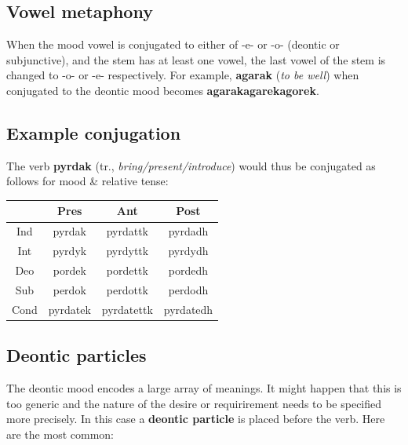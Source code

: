 \documentclass[10pt,oneside]{memoir}
\begin{document}
\begin{multicols}{2}
	\subsection{Vowel metaphony}

	When the mood vowel is conjugated to either of -e- or -o- (deontic or subjunctive), and the stem has at least one vowel, the last vowel of the stem is changed to -o- or -e- respectively. For example, \textbf{agarak} (\emph{to be well}) when conjugated to the deontic mood becomes \textbf{agarak}\textrightarrow\textbf{agarek}\textrightarrow\textbf{agorek}.


	\subsection{Example conjugation}

	\vspace{10pt}

	The verb \textbf{pyrdak} (tr., \emph{bring/present/introduce}) would thus be conjugated as follows for mood \& relative tense:

	\begin{tabular}{c | c c c}
			& Pres & Ant & Post \\
			\hline
		Ind	& pyrdak & pyrdattk & pyrdadh\\
		Int	& pyrdyk & pyrdyttk & pyrdydh\\
		Deo	& pordek & pordettk & pordedh\\
		Sub	& perdok & perdottk & perdodh\\
		Cond	& pyrdatek & pyrdatettk & pyrdatedh
	\end{tabular}

    \subsection{Deontic particles}

    The deontic mood encodes a large array of meanings. It might happen that this is too generic and the nature of the desire or requirirement needs to be specified more precisely. In this case a \textbf{deontic particle} is placed before the verb. Here are the most common:


\end{multicols}
\end{document}
